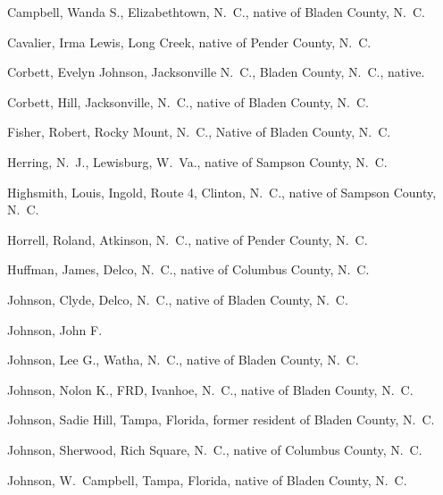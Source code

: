 \documentclass[11pt, a5paper, openright]{book}
\begin{document}
\begin{thebibliography}{99}
  Campbell, Wanda S., Elizabethtown, N.~C., native of Bladen County, N.~C.

  Cavalier, Irma Lewis, Long Creek, native of Pender County, N.~C.

  Corbett, Evelyn Johnson, Jacksonville N.~C., Bladen County, N.~C., native.

  Corbett, Hill, Jacksonville, N.~C., native of Bladen County, N.~C.

  Fisher, Robert, Rocky Mount, N.~C., Native of Bladen County, N.~C.

  Herring, N.~J., Lewisburg, W.~Va., native of Sampson County, N.~C.

  Highsmith, Louis, Ingold, Route 4, Clinton, N.~C., native of Sampson
  County, N.~C.

  Horrell, Roland, Atkinson, N.~C., native of Pender County, N.~C.

  Huffman, James, Delco, N.~C., native of Columbus County, N.~C.

  Johnson, Clyde, Delco, N.~C., native of Bladen County, N.~C.

  Johnson, John F.

  Johnson, Lee G., Watha, N.~C., native of Bladen County, N.~C.

  Johnson, Nolon K., FRD, Ivanhoe, N.~C., native of Bladen County, N.~C.

  Johnson, Sadie Hill, Tampa, Florida, former resident of Bladen County, N.~C.

  Johnson, Sherwood, Rich Square, N.~C., native of Columbus County, N.~C.

  Johnson, W.~Campbell, Tampa, Florida, native of Bladen County, N.~C.


\end{thebibliography}
\end{document}
